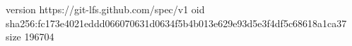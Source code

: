 version https://git-lfs.github.com/spec/v1
oid sha256:fc173e4021eddd066070631d0634f5b4b013e629e93d5e3f4df5c68618a1ca37
size 196704
